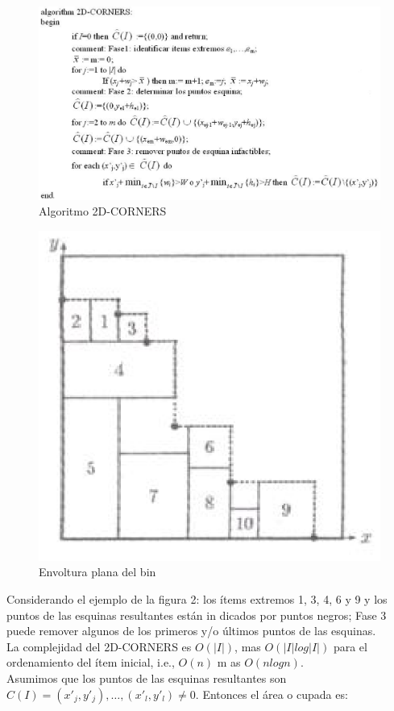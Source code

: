 \begin{figure}[!htb]
\centering
\includegraphics[scale=0.6]{fotos/foto1.eps}
\caption{Algoritmo 2D-CORNERS}
\end{figure}

\begin{figure}[!htb]
\centering
\includegraphics[scale=0.6]{fotos/foto2.eps}
\caption{Envoltura plana del bin}
\end{figure}

Considerando el ejemplo de la figura 2: los ítems extremos 1, 3, 4, 6 y 9 y los puntos de las esquinas resultantes están in
dicados por puntos negros; Fase 3 puede remover algunos de los primeros y/o últimos puntos de las esquinas.\\
La complejidad del 2D-CORNERS es \(O(|I|)\), mas \(O(|I| log |I|)\) para el ordenamiento del ítem inicial, i.e., \(O(n)\) m
as \(O(n log n)\).\\
Asumimos que los puntos de las esquinas resultantes son \(C(I)={(x'_j,y'_j),\dots{},(x'_l,y'_l)}\ne 0\). Entonces el área o
cupada es:

